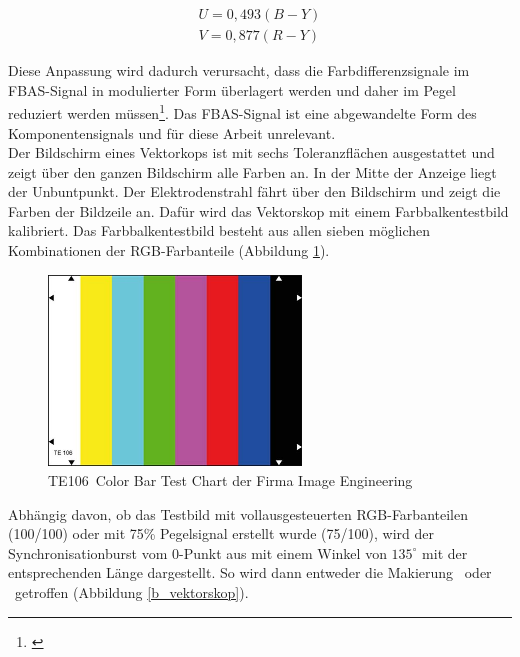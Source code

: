 \begin{eqnarray}\label{gl_vector1}
	U = 0,493(B-Y)\\
	V = 0,877(R-Y)
\end{eqnarray}

Diese Anpassung wird dadurch verursacht, dass die Farbdifferenzsignale im FBAS-Signal in modulierter Form überlagert werden und daher im Pegel reduziert werden müssen\footnote{\cite[84]{schmidt}}. Das FBAS-Signal ist eine abgewandelte Form des Komponentensignals und für diese Arbeit unrelevant.\\
Der Bildschirm eines Vektorkops ist mit sechs Toleranzflächen ausgestattet und zeigt über den ganzen Bildschirm alle Farben an. In der Mitte der Anzeige liegt der Unbuntpunkt. Der Elektrodenstrahl fährt über den Bildschirm und zeigt die Farben der Bildzeile an. Dafür wird das Vektorskop mit einem Farbbalkentestbild kalibriert. Das Farbbalkentestbild besteht aus allen sieben möglichen Kombinationen der RGB-Farbanteile (Abbildung \ref{b_te106}).

\begin{figure}[H]     %
\centering
\includegraphics[width=0.6\textwidth]{bilder/te106} 
\caption {\glqq TE106\grqq\ Color Bar Test Chart der Firma Image Engineering\protect\footnotemark}\label{b_te106}
\end{figure}

Abhängig davon, ob das Testbild mit vollausgesteuerten RGB-Farbanteilen (100/100) oder mit 75\% Pegelsignal erstellt wurde (75/100), wird der Synchronisationburst vom 0-Punkt aus mit einem Winkel von $135^\circ$ mit der entsprechenden Länge dargestellt. So wird dann entweder die Makierung \grqq\ oder \grqq\ getroffen (Abbildung \ref{b_vektorskop}).

